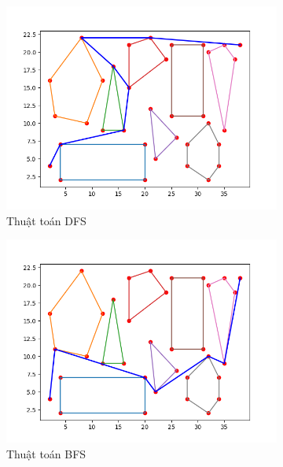 \documentclass[a4paper, 11pt]{article}
\begin{document}
\begin{figure}[h]
  \centering
  \begin{subfigure}{.3\linewidth}
      \centering
      \includegraphics[width=\textwidth,height=\textheight,keepaspectratio]{dfs.png}
      \caption{Thuật toán DFS}
  \end{subfigure}
      \hfill
  \begin{subfigure}{.3\linewidth}
      \centering
      \includegraphics[width=\textwidth,height=\textheight,keepaspectratio]{bfs.png}
      \caption{Thuật toán BFS}
  \end{subfigure}
     \hfill
  \begin{subfigure}{.3\linewidth}
      \centering

\end{subfigure}
\end{figure}
\end{document}
